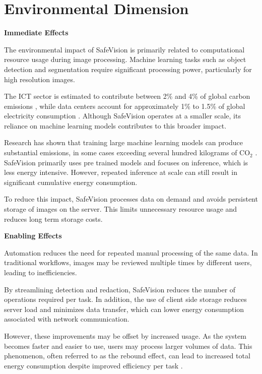 \section{Environmental Dimension}

\noindent\textbf{Immediate Effects}

The environmental impact of SafeVision is primarily related to computational resource usage during image processing. Machine learning tasks such as object detection and segmentation require significant processing power, particularly for high resolution images.

The ICT sector is estimated to contribute between 2\% and 4\% of global carbon emissions \cite{malmodin2018ict}, while data centers account for approximately 1\% to 1.5\% of global electricity consumption \cite{iea2023datacenters}. Although SafeVision operates at a smaller scale, its reliance on machine learning models contributes to this broader impact.

Research has shown that training large machine learning models can produce substantial emissions, in some cases exceeding several hundred kilograms of CO$_2$ \cite{strubell2019energy}. SafeVision primarily uses pre trained models and focuses on inference, which is less energy intensive. However, repeated inference at scale can still result in significant cumulative energy consumption.

To reduce this impact, SafeVision processes data on demand and avoids persistent storage of images on the server. This limits unnecessary resource usage and reduces long term storage costs.

\noindent\textbf{Enabling Effects}

Automation reduces the need for repeated manual processing of the same data. In traditional workflows, images may be reviewed multiple times by different users, leading to inefficiencies.

By streamlining detection and redaction, SafeVision reduces the number of operations required per task. In addition, the use of client side storage reduces server load and minimizes data transfer, which can lower energy consumption associated with network communication.

However, these improvements may be offset by increased usage. As the system becomes faster and easier to use, users may process larger volumes of data. This phenomenon, often referred to as the rebound effect, can lead to increased total energy consumption despite improved efficiency per task \cite{hilty2011rebound}.

